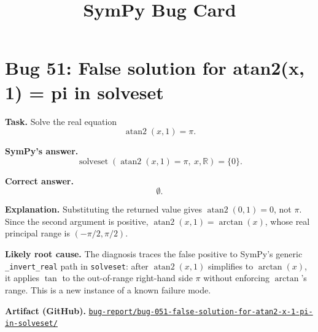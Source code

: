 \documentclass[11pt]{article}
\title{SymPy Bug Card}
\author{}
\date{}
\newcommand{\SymPy}{SymPy}
\newcommand{\artifactrepo}{https://github.com/TODO-org/TODO-repo}
\newcommand{\bugbundle}[1]{\href{\artifactrepo/tree/main/bug-report/#1}{\nolinkurl{bug-report/#1/}}}
\begin{document}
\maketitle

\section*{Bug 51: False solution for atan2(x, 1) = pi in solveset}

\begin{counterexamplebox}
\textbf{Task.} Solve the real equation
\[
\operatorname{atan2}(x,1)=\pi.
\]

\medskip
\textbf{SymPy's answer.}
\[
\operatorname{solveset}(\operatorname{atan2}(x,1)=\pi,\ x,\mathbb{R})=\{0\}.
\]

\medskip
\textbf{Correct answer.}
\[
\emptyset.
\]

\medskip
\textbf{Explanation.} Substituting the returned value gives
\(\operatorname{atan2}(0,1)=0\), not \(\pi\). Since the second argument is
positive, \(\operatorname{atan2}(x,1)=\arctan(x)\), whose real principal range
is \((-\pi/2,\pi/2)\).

\medskip
\textbf{Likely root cause.} The diagnosis traces the false positive to
\SymPy's generic \texttt{\_invert\_real} path in \texttt{solveset}: after
\(\operatorname{atan2}(x,1)\) simplifies to \(\arctan(x)\), it applies
\(\tan\) to the out-of-range right-hand side \(\pi\) without enforcing
\(\arctan\)'s range. This is a new instance of a known failure mode.

\medskip
\textbf{Artifact (GitHub).} \bugbundle{bug-051-false-solution-for-atan2-x-1-pi-in-solveset}
\end{counterexamplebox}
\end{document}
